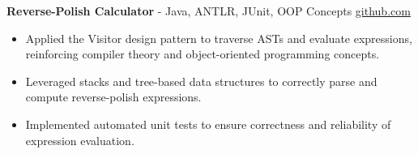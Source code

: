 \documentclass[11pt]{article}       %
\begin{document}
\textbf{Reverse-Polish Calculator}{ - Java, ANTLR, JUnit, OOP Concepts} \hfill \href{https://github.com/Monica20030707/reverse-Polish_calculator}{github.com} \\
\vspace{-9pt}
\begin{itemize}
  \item Applied the Visitor design pattern to traverse ASTs and evaluate expressions, reinforcing compiler theory and object-oriented programming concepts.
  \item Leveraged stacks and tree-based data structures to correctly parse and compute reverse-polish expressions.
  \item Implemented automated unit tests to ensure correctness and reliability of expression evaluation.
\end{itemize}

\end{document}
